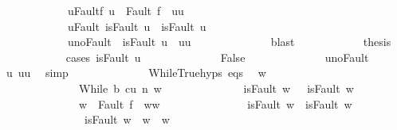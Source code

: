 \begin{isabellebody}
\ \ \ \ \ \ \ \ \ \ \ \ u{\isacharprime}{\isacharunderscore}Fault{\isacharunderscore}f{\isacharcolon}\ {\isachardoublequoteopen}u{\isacharprime}\ {\isacharequal}\ Fault\ f\ {\isasymlongrightarrow}\ u{\isacharprime}{\isacharequal}u{\isachardoublequoteclose}\ \isanewline
\ \ \ \ \ \ \ \ \ \ \ \ u{\isacharprime}{\isacharunderscore}Fault{\isacharcolon}\ {\isachardoublequoteopen}isFault\ u{\isacharprime}\ {\isasymlongrightarrow}\ isFault\ u{\isachardoublequoteclose}\ \isanewline
\ \ \ \ \ \ \ \ \ \ \ \ u{\isacharprime}{\isacharunderscore}noFault{\isacharcolon}\ {\isachardoublequoteopen}{\isasymnot}\ isFault\ u{\isacharprime}\ {\isasymlongrightarrow}\ u{\isacharprime}{\isacharequal}u{\isachardoublequoteclose}\isanewline
\ \ \ \ \ \ \ \ \ \ \ \ \isamarkupfalse%
\ blast\isanewline
\ \ \ \ \ \ \ \ \ \ \isamarkupfalse%
\ {\isacharquery}thesis\isanewline
\ \ \ \ \ \ \ \ \ \ \isamarkupfalse%
\ {\isacharparenleft}cases\ {\isachardoublequoteopen}isFault\ u{\isacharprime}{\isachardoublequoteclose}{\isacharparenright}\isanewline
\ \ \ \ \ \ \ \ \ \ \ \ \isamarkupfalse%
\ False\isanewline
\ \ \ \ \ \ \ \ \ \ \ \ \isamarkupfalse%
\ u{\isacharprime}{\isacharunderscore}noFault\ \isamarkupfalse%
\ u{\isacharprime}{\isacharcolon}\ {\isachardoublequoteopen}u{\isacharprime}{\isacharequal}u{\isachardoublequoteclose}\ \isamarkupfalse%
\ simp\isanewline
\ \ \ \ \ \ \ \ \ \ \ \ \isamarkupfalse%
\ WhileTrue{\isachardot}hyps\ eqs\ \isamarkupfalse%
\ w{\isacharprime}\ \isanewline
\ \ \ \ \ \ \ \ \ \ \ \ \ \ {\isachardoublequoteopen}{\isasymGamma}{\isasymturnstile}{\isasymlangle}While\ b\ c{\isacharcomma}u{\isasymrangle}\ {\isacharequal}n{\isasymRightarrow}\ w{\isacharprime}{\isachardoublequoteclose}\isanewline
\ \ \ \ \ \ \ \ \ \ \ \ \ \ {\isachardoublequoteopen}isFault\ w\ \ {\isasymlongrightarrow}\ isFault\ w{\isacharprime}{\isachardoublequoteclose}\isanewline
\ \ \ \ \ \ \ \ \ \ \ \ \ \ {\isachardoublequoteopen}w{\isacharprime}\ {\isacharequal}\ Fault\ f\ {\isasymlongrightarrow}\ w{\isacharprime}{\isacharequal}w{\isachardoublequoteclose}\ \isanewline
\ \ \ \ \ \ \ \ \ \ \ \ \ \ {\isachardoublequoteopen}isFault\ w{\isacharprime}\ {\isasymlongrightarrow}\ isFault\ w{\isachardoublequoteclose}\ \isanewline
\ \ \ \ \ \ \ \ \ \ \ \ \ \ {\isachardoublequoteopen}{\isasymnot}\ isFault\ w{\isacharprime}\ {\isasymlongrightarrow}\ w{\isacharprime}\ {\isacharequal}\ w{\isachardoublequoteclose}\isanewline

\end{isabellebody}
